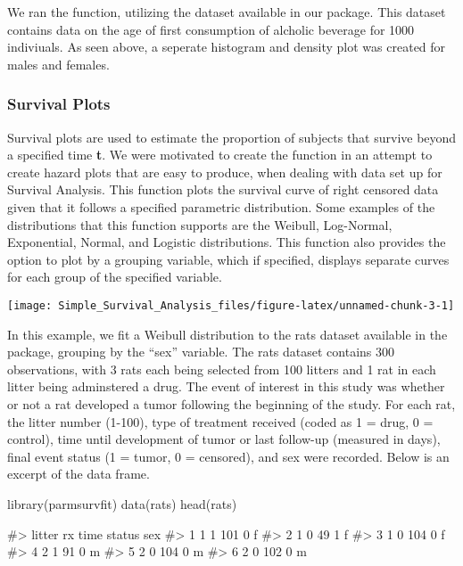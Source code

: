 We ran the  function, utilizing the
 dataset available in our package. This dataset
contains data on the age of first consumption of alcholic beverage for
1000 indiviuals. As seen above, a seperate histogram and density plot
was created for males and females.

\hypertarget{survival-plots}{%
\subsubsection{Survival Plots}\label{survival-plots}}

Survival plots are used to estimate the proportion of subjects that
survive beyond a specified time \textbf{t}. We were motivated to create
the function  in an attempt to create hazard plots that
are easy to produce, when dealing with data set up for Survival
Analysis. This function plots the survival curve of right censored data
given that it follows a specified parametric distribution. Some examples
of the distributions that this function supports are the Weibull,
Log-Normal, Exponential, Normal, and Logistic distributions. This
function also provides the option to plot by a grouping variable, which
if specified, displays separate curves for each group of the specified
variable.

\begin{Schunk}

\texttt{[image: Simple\_Survival\_Analysis\_files/figure-latex/unnamed-chunk-3-1]} \end{Schunk}

In this example, we fit a Weibull distribution to the rats dataset
available in the  package, grouping by the ``sex''
variable. The rats dataset contains 300 observations, with 3 rats each
being selected from 100 litters and 1 rat in each litter being
adminstered a drug. The event of interest in this study was whether or
not a rat developed a tumor following the beginning of the study. For
each rat, the litter number (1-100), type of treatment received (coded
as 1 = drug, 0 = control), time until development of tumor or last
follow-up (measured in days), final event status (1 = tumor, 0 =
censored), and sex were recorded. Below is an excerpt of the data frame.

\begin{Schunk}
\begin{Sinput}
library(parmsurvfit)
data(rats)
head(rats)
\end{Sinput}
\begin{Soutput}
#>   litter rx time status sex
#> 1      1  1  101      0   f
#> 2      1  0   49      1   f
#> 3      1  0  104      0   f
#> 4      2  1   91      0   m
#> 5      2  0  104      0   m
#> 6      2  0  102      0   m
\end{Soutput}
\end{Schunk}

